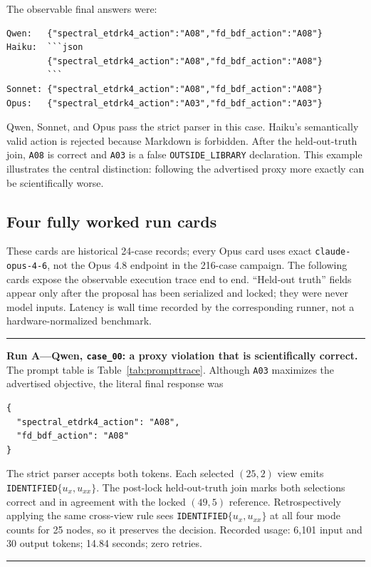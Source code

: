 \documentclass{article}
\newcommand{\ID}{\texttt{IDENTIFIED}\xspace}
\newcommand{\OUT}{\texttt{OUTSIDE\_LIBRARY}\xspace}
\begin{document}
The observable final answers were:
\begin{verbatim}
Qwen:   {"spectral_etdrk4_action":"A08","fd_bdf_action":"A08"}
Haiku:  ```json
        {"spectral_etdrk4_action":"A08","fd_bdf_action":"A08"}
        ```
Sonnet: {"spectral_etdrk4_action":"A08","fd_bdf_action":"A08"}
Opus:   {"spectral_etdrk4_action":"A03","fd_bdf_action":"A03"}
\end{verbatim}
Qwen, Sonnet, and Opus pass the strict parser in this case. Haiku's semantically valid action is
rejected because Markdown is forbidden. After the held-out-truth join, \texttt{A08} is correct and
\texttt{A03} is a false \OUT declaration. This example illustrates the central distinction:
following the advertised proxy more exactly can be scientifically worse.

\subsection{Four fully worked run cards}
These cards are historical 24-case records; every Opus card uses exact
\texttt{claude-opus-4-6}, not the Opus 4.8 endpoint in the 216-case campaign.
The following cards expose the observable execution trace end to end. ``Held-out truth'' fields appear
only after the proposal has been serialized and locked; they were never model inputs. Latency is
wall time recorded by the corresponding runner, not a hardware-normalized benchmark.

\noindent\begin{minipage}{\linewidth}
\hrule\smallskip
\textbf{Run A---Qwen, \texttt{case\_00}: a proxy violation that is scientifically correct.}
The prompt table is Table~\ref{tab:prompttrace}. Although \texttt{A03} maximizes the advertised
objective, the literal final response was
\begin{verbatim}
{
  "spectral_etdrk4_action": "A08",
  "fd_bdf_action": "A08"
}
\end{verbatim}
The strict parser accepts both tokens. Each selected $(25,2)$ view emits
\ID $\{u_x,u_{xx}\}$. The post-lock held-out-truth join marks both selections correct and in agreement
with the locked $(49,5)$ reference. Retrospectively applying the same cross-view rule sees
\ID $\{u_x,u_{xx}\}$ at all four mode counts for 25 nodes, so it preserves the decision.
Recorded usage: 6,101 input and 30 output tokens; 14.84 seconds; zero retries.
\smallskip\hrule
\end{minipage}
\end{document}
